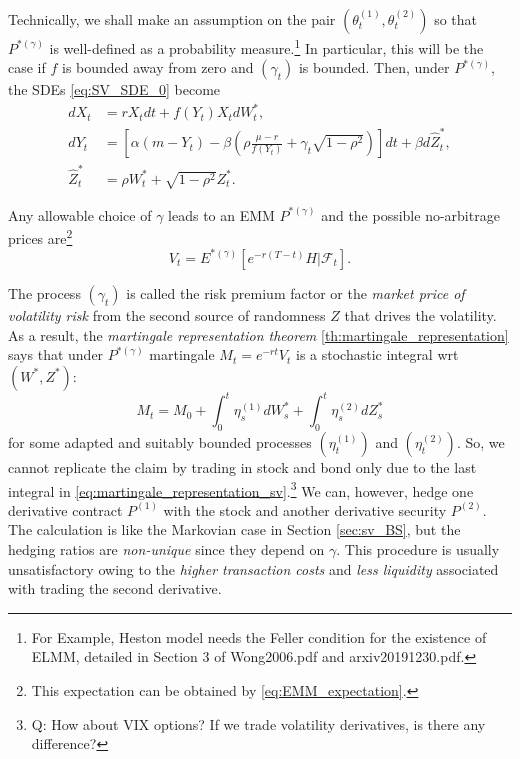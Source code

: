 \documentclass[a4paper,12pt]{article}
\numberwithin{equation}{section}
\theoremstyle{definition}
\theoremstyle{remark}
\begin{document}
Technically, we shall make an assumption on the pair 
$(\theta_{t}^{(1)},\theta_{t}^{(2)})$ so that $P^{*(\gamma)}$ is 
well-defined as a probability measure.\footnote{For Example, Heston 
model needs the Feller condition for the existence of ELMM, detailed 
in Section 3 of Wong2006.pdf and arxiv20191230.pdf.} In particular, 
this will be the case if $f$ is bounded away from zero and 
$(\gamma_{t})$ is bounded. Then, under $P^{*(\gamma)}$, the SDEs 
\eqref{eq:SV_SDE_0} become 
\begin{equation}
    \begin{split}
        dX_{t}&=rX_{t}dt+f(Y_{t})X_{t}dW_{t}^{*}, \\
        dY_{t}&=\left[\alpha(m-Y_{t})-\beta\left(\rho
        \frac{\mu-r}{f(Y_{t})}+\gamma_{t}\sqrt{1-\rho^{2}}
        \right)\right]dt+\beta d\hat{Z}_{t}^{*}, \\
        \hat{Z}_{t}^{*}&=\rho W_{t}^{*}+\sqrt{1-\rho^{2}}Z_{t}^{*}.
    \end{split}
\end{equation}

Any allowable choice of $\gamma$ leads to an EMM $P^{*(\gamma)}$ 
and the possible no-arbitrage prices are\footnote{This expectation can 
be obtained by \eqref{eq:EMM_expectation}.}
\begin{equation}\label{eq:sv_risk_neutral_valuation}
    V_{t}=E^{*(\gamma)}[e^{-r(T-t)}H|\mathcal{F}_{t}].
\end{equation}

The process $(\gamma_{t})$ is called the risk premium factor or the 
\textit{market price of volatility risk} from the second source of 
randomness $Z$ that drives the volatility. As a result, the 
\textit{martingale representation theorem} 
\ref{th:martingale_representation} says that under $P^{*(\gamma)}$ 
martingale $M_{t}=e^{-rt}V_{t}$ is a stochastic integral 
wrt $(W^{*},Z^{*})$:
\begin{equation}\label{eq:martingale_representation_sv}
    M_{t}=M_{0}+\int_{0}^{t} \eta_{s}^{(1)} dW_{s}^{*}
    +\int_{0}^{t} \eta_s^{(2)} dZ^{*}_{s}
\end{equation}
for some adapted and suitably bounded processes $(\eta_{t}^{(1)})$ 
and $(\eta_{t}^{(2)})$. So, we cannot replicate the claim by 
trading in stock and bond only due to the last integral in 
\eqref{eq:martingale_representation_sv}.\footnote{Q: How about VIX 
options? If we trade volatility derivatives, is there any difference?} 
We can, however, hedge one derivative contract $P^{(1)}$ with the 
stock and another derivative security $P^{(2)}$. The calculation 
is like the Markovian case in Section \ref{sec:sv_BS}, but the 
hedging ratios are \textit{non-unique} since they depend on 
$\gamma$. This procedure is usually unsatisfactory owing to the 
\textit{higher transaction costs} and \textit{less liquidity} 
associated with trading the second derivative.
\end{document}
